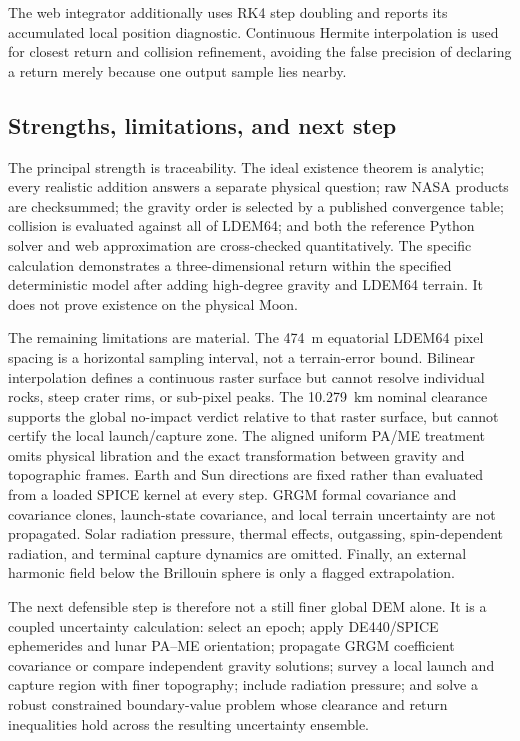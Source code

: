 The web integrator additionally uses RK4 step doubling and reports its
accumulated local position diagnostic. Continuous Hermite interpolation is
used for closest return and collision refinement, avoiding the false precision
of declaring a return merely because one output sample lies nearby.

\subsection{Strengths, limitations, and next  step}

The principal strength is traceability. The ideal existence theorem is
analytic; every realistic addition answers a separate physical question; raw
NASA products are checksummed; the gravity order is selected by a published
convergence table; collision is evaluated against all of LDEM64; and both the
reference Python solver and web approximation are cross-checked quantitatively.
The specific calculation demonstrates a three-dimensional return within the
specified deterministic model after adding high-degree gravity and LDEM64
terrain. It does not prove existence on the physical Moon.

The remaining limitations are material. The \SI{474}{m} equatorial LDEM64
pixel spacing is a horizontal sampling interval, not a terrain-error bound.
Bilinear interpolation defines a continuous raster surface but cannot resolve
individual rocks, steep crater rims, or sub-pixel peaks. The
\SI{10.279}{km} nominal clearance supports the global no-impact verdict
relative to that raster surface, but cannot certify the local launch/capture
zone. The aligned uniform PA/ME treatment omits physical
libration and the exact transformation between gravity and topographic frames.
Earth and Sun directions are fixed rather than evaluated from a loaded SPICE
kernel at every step. GRGM formal covariance and covariance clones,
launch-state covariance, and local terrain uncertainty are not propagated.
Solar radiation pressure, thermal
effects, outgassing, spin-dependent radiation, and terminal capture dynamics
are omitted. Finally, an external harmonic field below the Brillouin sphere is
only a flagged extrapolation.

The next defensible step is therefore not a still finer global DEM alone. It is
a coupled uncertainty calculation: select an epoch; apply DE440/SPICE
ephemerides and lunar PA--ME orientation; propagate GRGM coefficient
covariance or compare independent gravity solutions; survey a local launch and
capture region with finer topography; include radiation pressure; and solve a
robust constrained boundary-value problem whose clearance and return
inequalities hold across the resulting uncertainty ensemble.


